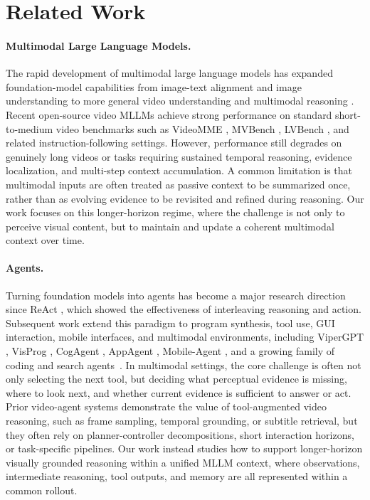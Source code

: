 \documentclass[11pt, letterpaper]{template}
\theoremstyle{plain}
\theoremstyle{definition}
\theoremstyle{remark}
\begin{document}
\section{Related Work}

\paragraph{Multimodal Large Language Models.}
The rapid development of multimodal large language models has expanded foundation-model capabilities from image-text alignment and image understanding \citep{clip,flamingo,llava,pmlr-v202-li23q,internvl,internvl2} to more general video understanding and multimodal reasoning \citep{internvideo,internvideo2,wang2025internvideo2,videollama2,Llava-onevision,qwen3vl}. Recent open-source video MLLMs achieve strong performance on standard short-to-medium video benchmarks such as VideoMME \citep{videomme}, MVBench \citep{mvbench}, LVBench \citep{wang2024lvbench}, and related instruction-following settings. However, performance still degrades on genuinely long videos or tasks requiring sustained temporal reasoning, evidence localization, and multi-step context accumulation. A common limitation is that multimodal inputs are often treated as passive context to be summarized once, rather than as evolving evidence to be revisited and refined during reasoning. Our work focuses on this longer-horizon regime, where the challenge is not only to perceive visual content, but to maintain and update a coherent multimodal context over time.

\paragraph{Agents.}
Turning foundation models into agents has become a major research direction since ReAct \citep{react}, which showed the effectiveness of interleaving reasoning and action. Subsequent work extend this paradigm to program synthesis, tool use, GUI interaction, mobile interfaces, and multimodal environments, including ViperGPT \citep{vipergpt}, VisProg \citep{visprog}, CogAgent \citep{cogagent}, AppAgent \citep{appagent}, Mobile-Agent \citep{mobileagent}, and a growing family of coding and search agents~\citep{yang2024swe, wang2025openhands, jin2025search, zheng2025deepresearcher}. In multimodal settings, the core challenge is often not only selecting the next tool, but deciding what perceptual evidence is missing, where to look next, and whether current evidence is sufficient to answer or act. Prior video-agent systems \citep{videoagent1,videoagent2} demonstrate the value of tool-augmented video reasoning, such as frame sampling, temporal grounding, or subtitle retrieval, but they often rely on planner-controller decompositions, short interaction horizons, or task-specific pipelines. Our work instead studies how to support longer-horizon visually grounded reasoning within a unified MLLM context, where observations, intermediate reasoning, tool outputs, and memory are all represented within a common rollout.
\end{document}
